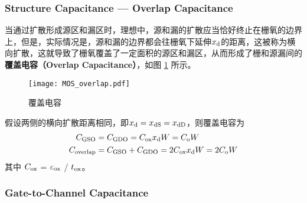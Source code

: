 \subsubsection{Structure Capacitance — Overlap Capacitance}
当通过扩散形成源区和漏区时，理想中，源和漏的扩散应当恰好终止在栅氧的边界上，但是，实际情况是，源和漏的边界都会往栅氧下延伸$x_{\rm{d}}$的距离，这被称为横向扩散，这就导致了栅氧覆盖了一定面积的源区和漏区，从而形成了栅和源漏间的\textbf{覆盖电容（Overlap Capacitance）}，如图 \ref{fig:overlap_capacitance} 所示。
\begin{figure}[!htb]
    \centering
    \texttt{[image: MOS\_overlap.pdf]}
    \caption{覆盖电容}
    \label{fig:overlap_capacitance}
\end{figure}

假设两侧的横向扩散距离相同，即$x_{\rm{d}} = x_{\rm{dS}} = x_{\rm{dD}}$，则覆盖电容为
\begin{equation}
    \begin{aligned}
        C_{\rm{GSO}} &= C_{\rm{GDO}} = C_{\rm{ox}} x_{\rm{d}} W = C_{\rm{o}} W \\
        C_{\rm{overlap}} &= C_{\rm{GSO}} + C_{\rm{GDO}} = 2 C_{\rm{ox}} x_{\rm{d}} W = 2 C_{\rm{o}} W \\
    \end{aligned}
\end{equation}
其中 $C_{\rm{ox}}$ = ${\varepsilon_{\rm{ox}}}$ / ${t_{\rm{ox}}}$。

\subsubsection{Gate-to-Channel Capacitance}
